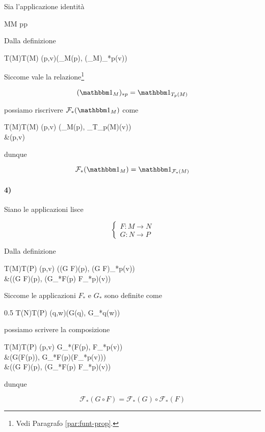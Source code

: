 {Sia l'applicazione identità

	{M}{M}
	{p}{p}

Dalla definizione

	{T(M)}{T(M)}
	{(p,v)}{(\bigone_{M}(p), (\bigone_{M})_{*p}(v))}

Siccome vale la relazione\footnote{%
	Vedi Paragrafo \ref{par:funt-prop}.%
}

\begin{equation}
	(\bigone_{M})_{*p} = \bigone_{T_{p}(M)}
\end{equation}

possiamo riscrivere $ \mathcal{F}_{*}(\bigone_{M}) $ come

	{T(M)}{T(M)}
	{(p,v)}{ %
			(\bigone_{M}(p), \bigone_{T_{p}(M)}(v)) \\
			&\mapsto (p,v)
			}

dunque

\begin{equation}
	\mathcal{F}_{*}(\bigone_{M}) = \bigone_{\mathcal{F}_{*}(M)}
\end{equation}

\paragraph{4)}

Siano le applicazioni lisce

\begin{equation}
	\begin{cases}
		F : M \to N \\
		G : N \to P
	\end{cases}
\end{equation}

Dalla definizione

	{T(M)}{T(P)}
	{(p,v)}{ %
			((G \circ F)(p), (G \circ F)_{*p}(v)) \\
			&\mapsto ((G \circ F)(p), (G_{*F(p)} \circ F_{*p})(v))
			}

Siccome le applicazioni $ F_{*} $ e $ G_{*} $ sono definite come

	{0.5}{%
				{T(N)}{T(P)}
				{(q,w)}{(G(q), G_{*q}(w))}
			}

possiamo scrivere la composizione

	{T(M)}{T(P)}
	{(p,v)}{ %
				G_{*}(F(p), F_{*p}(v)) \\
				&\mapsto (G(F(p)), G_{*F(p)}(F_{*p}(v))) \\
				&\mapsto ((G \circ F)(p), (G_{*F(p)} \circ F_{*p})(v))
				}

dunque

\begin{equation}
	\mathcal{F}_{*}(G \circ F) = \mathcal{F}_{*}(G) \circ \mathcal{F}_{*}(F)
\end{equation}
}

